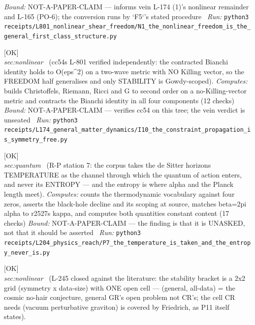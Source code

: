 \begin{description}
 \emph{Bound:} NOT-A-PAPER-CLAIM --- informs vein L-174 (1)'s nonlinear remainder and L-165 (PO-6); the conversion runs by `F5`'s stated procedure
\ \emph{Run:} \texttt{python3 receipts/L801\_nonlinear\_shear\_freedom/N1\_the\_nonlinear\_freedom\_is\_the\_general\_first\_class\_structure.py}
\item[\label{rcpt:I10_the_constraint_propagation_is_symmetry_free}\texttt{I10\_the\_constraint\_propagation\_is\_symmetry\_free}]\hfill\textsf{[OK]}\\
\textit{sec:nonlinear} \ (cc54s L-801 verified independently: the contracted Bianchi identity holds to O(eps\textasciicircum{}2) on a two-wave metric with NO Killing vector, so the FREEDOM half generalises and only STABILITY is Gowdy-scoped). 
\emph{Computes:} builds Christoffels, Riemann, Ricci and G to second order on a no-Killing-vector metric and contracts the Bianchi identity in all four components (12 checks)
 \emph{Bound:} NOT-A-PAPER-CLAIM --- verifies cc54 on this tree; the vein verdict is unseated
\ \emph{Run:} \texttt{python3 receipts/L174\_general\_matter\_dynamics/I10\_the\_constraint\_propagation\_is\_symmetry\_free.py}
\item[\label{rcpt:P7_the_temperature_is_taken_and_the_entropy_never_is}\texttt{P7\_the\_temperature\_is\_taken\_and\_the\_entropy\_never\_is}]\hfill\textsf{[OK]}\\
\textit{sec:quantum} \ (R-P station 7: the corpus takes the de Sitter horizons TEMPERATURE as the channel through which the quantum of action enters, and never its ENTROPY --- and the entropy is where alpha and the Planck length meet). 
\emph{Computes:} counts the thermodynamic vocabulary against four zeros, asserts the black-hole decline and its scoping at source, matches beta=2pi alpha to r2527s kappa, and computes both quantities constant content (17 checks)
 \emph{Bound:} NOT-A-PAPER-CLAIM --- the finding is that it is UNASKED, not that it should be asserted
\ \emph{Run:} \texttt{python3 receipts/L204\_physics\_reach/P7\_the\_temperature\_is\_taken\_and\_the\_entropy\_never\_is.py}
\item[\label{rcpt:S1_the_stability_bracket_closes_the_needed_cell_is_covered}\texttt{S1\_the\_stability\_bracket\_closes\_the\_needed\_cell\_is\_covered}]\hfill\textsf{[OK]}\\
\textit{sec:nonlinear} \ (L-245 closed against the literature: the stability bracket is a 2x2 grid (symmetry x data-size) with ONE open cell --- (general, all-data) = the cosmic no-hair conjecture, general GR's open problem not CR's; the cell CR needs (vacuum perturbative graviton) is covered by Friedrich, as P11 itself states). 

\end{description}
